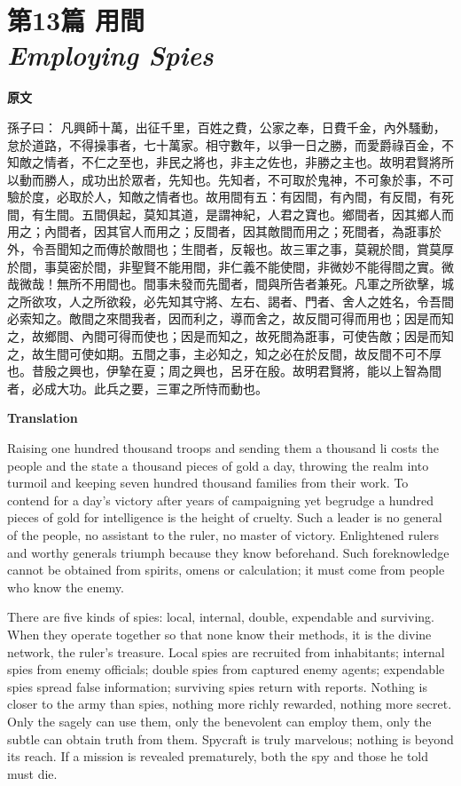 \documentclass[12pt]{book}
\newcommand{\chapterentry}[4]{%
  \chapter[\texorpdfstring{#1}{#1}]{\texorpdfstring{#1\\\Large\textit{#2}}{#1 — #2}}%
  \noindent\textbf{原文}\par
  #3

  \bigskip
  \noindent\textbf{Translation}\par
  #4
}
\begin{document}
\chapterentry{第13篇 用間}{Employing Spies}{%
孫子曰： 凡興師十萬，出征千里，百姓之費，公家之奉，日費千金，內外騷動，怠於道路，不得操事者，七十萬家。相守數年，以爭一日之勝，而愛爵祿百金，不知敵之情者，不仁之至也，非民之將也，非主之佐也，非勝之主也。故明君賢將所以動而勝人，成功出於眾者，先知也。先知者，不可取於鬼神，不可象於事，不可驗於度，必取於人，知敵之情者也。故用間有五：有因間，有內間，有反間，有死間，有生間。五間俱起，莫知其道，是謂神紀，人君之寶也。鄉間者，因其鄉人而用之；內間者，因其官人而用之；反間者，因其敵間而用之；死間者，為誑事於外，令吾聞知之而傳於敵間也；生間者，反報也。故三軍之事，莫親於間，賞莫厚於間，事莫密於間，非聖賢不能用間，非仁義不能使間，非微妙不能得間之實。微哉微哉！無所不用間也。間事未發而先聞者，間與所告者兼死。凡軍之所欲擊，城之所欲攻，人之所欲殺，必先知其守將、左右、謁者、門者、舍人之姓名，令吾間必索知之。敵間之來間我者，因而利之，導而舍之，故反間可得而用也；因是而知之，故鄉間、內間可得而使也；因是而知之，故死間為誑事，可使告敵；因是而知之，故生間可使如期。五間之事，主必知之，知之必在於反間，故反間不可不厚也。昔殷之興也，伊摯在夏；周之興也，呂牙在殷。故明君賢將，能以上智為間者，必成大功。此兵之要，三軍之所恃而動也。}{%
Raising one hundred thousand troops and sending them a thousand li costs the people and the state a thousand pieces of gold a day, throwing the realm into turmoil and keeping seven hundred thousand families from their work. To contend for a day’s victory after years of campaigning yet begrudge a hundred pieces of gold for intelligence is the height of cruelty. Such a leader is no general of the people, no assistant to the ruler, no master of victory. Enlightened rulers and worthy generals triumph because they know beforehand. Such foreknowledge cannot be obtained from spirits, omens or calculation; it must come from people who know the enemy.

There are five kinds of spies: local, internal, double, expendable and surviving. When they operate together so that none know their methods, it is the divine network, the ruler’s treasure. Local spies are recruited from inhabitants; internal spies from enemy officials; double spies from captured enemy agents; expendable spies spread false information; surviving spies return with reports. Nothing is closer to the army than spies, nothing more richly rewarded, nothing more secret. Only the sagely can use them, only the benevolent can employ them, only the subtle can obtain truth from them. Spycraft is truly marvelous; nothing is beyond its reach. If a mission is revealed prematurely, both the spy and those he told must die.

}
\end{document}
